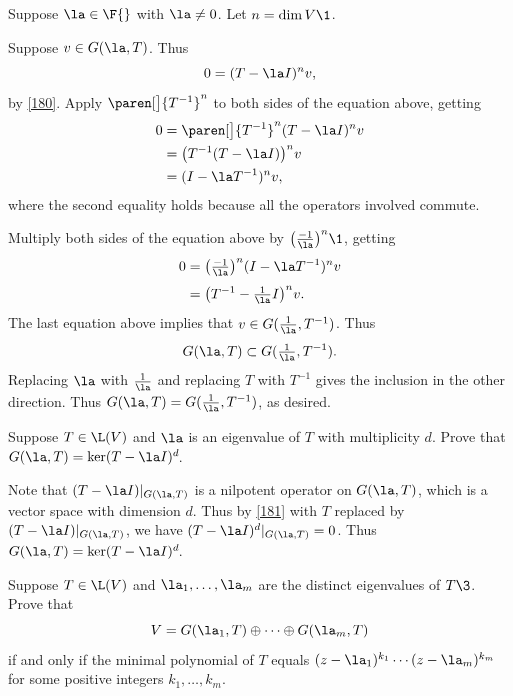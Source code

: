 \begin{Solution}
Suppose $\la \in \F{}$ with $\la \ne 0$. Let $n = \dim V\1$.

Suppose $v \in G(\la, T)$. Thus
\[
0 = (T - \la I)^n v,
\]
by \ref{180}. Apply $\paren[\big]{T^{-1}}^n$ to both sides of the equation above, getting
\begin{align*}
0 &= \paren[\big]{T^{-1}}^n (T - \la I)^n v \\
&= \bigl( T^{-1}(T - \la I) \bigr)^n v \\
&= (I - \la T^{-1})^n v,
\end{align*}
where the second equality holds because all the operators involved commute.

Multiply both sides of the equation above by $\bigl(\frac{-1}{\la}\bigr)^n\1$, getting
\begin{align*}
0 &= \bigl(\tfrac{-1}{\la}\bigr)^n (I - \la T^{-1})^n v \\[3bp]
&= \bigl(T^{-1} - \tfrac{1}{\la}I  \bigr)^n v.
\end{align*}
The last equation above implies that $v \in G(\frac{1}{\la}, T^{-1})$. Thus
\[
G(\la, T) \subset G(\tfrac{1}{\la}, T^{-1}).
\]
Replacing $\la$ with $\frac{1}{\la}$ and replacing $T$ with $T^{-1}$ gives the inclusion in the other direction. Thus $G(\la, T) = G(\frac{1}{\la}, T^{-1})$, as desired.
\end{Solution}

\exercise
Suppose $T \in \L(V)$ and $\la$ is an eigenvalue of $T$ with multiplicity $d$. Prove that
$
G(\la, T) = \ker(T - \la I)^d\!$.

\begin{Solution}
Note that $(T - \la I)|_{G(\la, T)}$ is a nilpotent operator on $G(\la, T)$, which is a vector space with dimension $d$. Thus by \ref{181} with $T$ replaced by $(T - \la I)|_{G(\la, T)}$, we have $(T - \la I)^d|_{G(\la, T)} = 0$. Thus $G(\la, T) = \ker(T - \la I)^d\!$.
\end{Solution}

\exercise
Suppose $T \in \L(V)$ and $\la_1, \ldots, \la_m$ are the distinct eigenvalues of $T\3$. Prove that\label{8Rdecomp}
\[
V = G(\la_1, T) \oplus \cdots \oplus G(\la_m, T)
\]
if and only if the minimal polynomial of $T$ equals
$(z-\la_1)^{k_1} \cdots (z - \la_m)^{k_m}$ for some positive integers $k_1, \ldots, k_m$.


